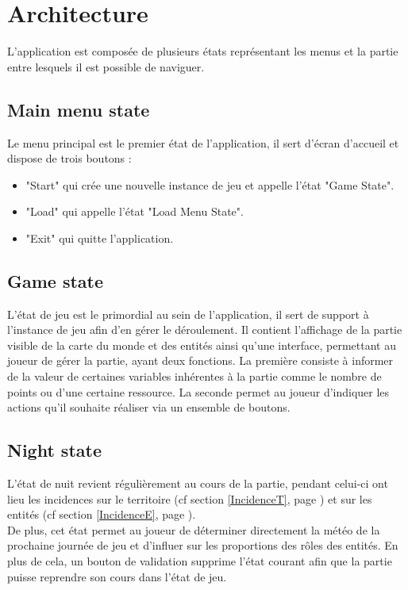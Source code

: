 \documentclass[a4paper]{memoir}
\begin{document}
		\section{Architecture}
			L'application est composée de plusieurs états représentant les menus et la partie entre lesquels il est possible de naviguer.
			
			\subsection{Main menu state}
				Le menu principal est le premier état de l’application, il sert d’écran d’accueil et dispose de trois boutons :
				\begin{itemize}[label=$\bullet$]
					\item "Start" qui crée une nouvelle instance de jeu et appelle l’état "Game State".
					\item "Load" qui appelle l’état "Load Menu State".
					\item "Exit" qui quitte l’application.
				\end{itemize}
				
			\subsection{Game state}
				L’état de jeu est le primordial au sein de l’application, il sert de support à l’instance de jeu afin d’en gérer le déroulement. Il contient l’affichage de la partie visible de la carte du monde et des entités ainsi qu’une interface, permettant au joueur de gérer la partie, ayant deux fonctions. La première consiste à informer de la valeur de certaines variables inhérentes à la partie comme le nombre de points ou d’une certaine ressource. La seconde permet au joueur d’indiquer les actions qu’il souhaite réaliser via un ensemble de boutons.
				
			\subsection{Night state}
				L’état de nuit revient régulièrement au cours de la partie, pendant celui-ci ont lieu les incidences sur le territoire (cf section \ref{IncidenceT}, page \pageref{IncidenceT}) et sur les entités (cf section \ref{IncidenceE}, page \pageref{IncidenceE}).\\
				De plus, cet état permet au joueur de déterminer directement la météo de la prochaine journée de jeu et d’influer sur les proportions des rôles des entités. En plus de cela, un bouton de validation supprime l’état courant afin que la partie puisse reprendre son cours dans l’état de jeu.
				
\end{document}
